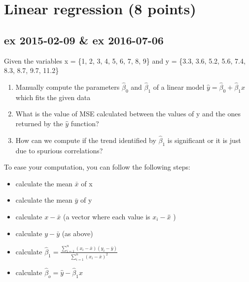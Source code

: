 \documentclass[a4paper,12pt,titlepage]{article} %
\begin{document}
\newpage
\section{Linear regression (8 points)}
\subsection{ex 2015-02-09 \& ex 2016-07-06}
Given the variables x = \{1, 2, 3, 4, 5, 6, 7, 8, 9\} and y = \{3.3, 3.6, 5.2, 5.6, 7.4, 8.3, 8.7, 9.7, 11.2\}
\begin{enumerate}
\item Manually compute the parameters $\hat{\beta}_{0} $ and $\hat{\beta}_{1} $ of a linear model $ \hat{y} = \hat{\beta}_{0} + \hat{\beta}_{1} x$ which fits the given data
\item What is the value of MSE calculated between the values of y and the ones returned by the $\hat{y}$ function?
\item How can we compute if the trend identified by $\hat{\beta}_{1}$ is significant or it is just due to spurious correlations?
\end{enumerate}
 
To ease your computation, you can follow the following steps:
\begin{itemize}
\item calculate the mean $\bar{x}$ of x
\item calculate the mean $\bar{y}$ of y
\item calculate $ x - \bar{x} $ (a vector where each value is $ x_{i} - \bar{x} $̄ )
\item calculate $ y - \bar{y} $ (as above)
\item calculate $ \hat{\beta}_{1} = \frac{\sum_{i=1}^{n} (x_{i}-\bar{x}) (y_{i}-\bar{y})}{ \sum_{i=1}^{n} (x_{i}-\bar{x})^{2} } $
\item calculate $ \hat{\beta}_{o} = \hat{y} - \hat{\beta}_{1} x $
\end{itemize}
\end{document}
